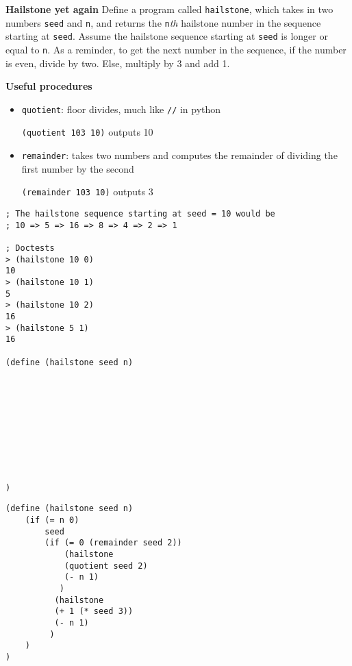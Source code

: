 \begin{blocksection}
\question \textbf{Hailstone yet again} Define a program called \lstinline$hailstone$,
which takes in two numbers \lstinline$seed$ and \lstinline$n$, and returns the
\lstinline$n$\emph{th} hailstone number in the sequence starting at \lstinline$seed$.
Assume the hailstone sequence starting at \lstinline$seed$ is longer or equal to
\lstinline$n$. As a reminder, to get the next number in the sequence, if the number
is even, divide by two. Else, multiply by 3 and add 1.

\textbf{Useful procedures}

\begin{itemize}
\item \lstinline$quotient$: floor divides, much like \lstinline$//$ in python

\lstinline$(quotient 103 10)$ outputs 10

\item \lstinline$remainder$: takes two numbers and computes the remainder of dividing the first number by the second

\lstinline$(remainder 103 10)$ outputs 3
\end{itemize}

\vspace{\baselineskip}

\ifprintanswers\else
\begin{lstlisting}
; The hailstone sequence starting at seed = 10 would be
; 10 => 5 => 16 => 8 => 4 => 2 => 1

; Doctests
> (hailstone 10 0)
10
> (hailstone 10 1)
5
> (hailstone 10 2)
16
> (hailstone 5 1)
16

(define (hailstone seed n)










)
\end{lstlisting}
\fi

\begin{solution}[0.1in]
\begin{lstlisting}
(define (hailstone seed n)
    (if (= n 0)
        seed
        (if (= 0 (remainder seed 2))
            (hailstone
            (quotient seed 2)
            (- n 1)
           )
          (hailstone
          (+ 1 (* seed 3))
          (- n 1)
         )
    )
)
\end{lstlisting}
\end{solution}
\end{blocksection}
